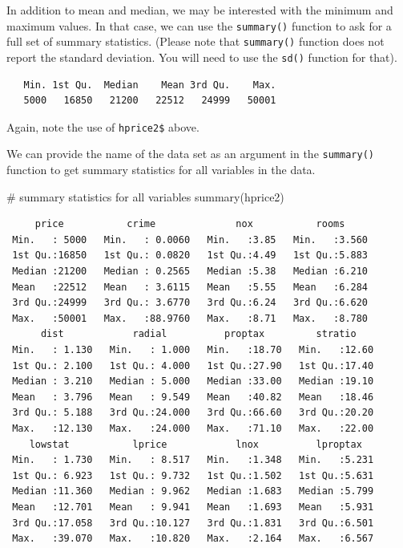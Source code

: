 \documentclass[
  letterpaper,
  DIV=11,
  numbers=noendperiod]{scrreprt}
\newenvironment{Shaded}{\begin{snugshade}}{\end{snugshade}}
\newcommand{\CommentTok}[1]{\textcolor[rgb]{0.37,0.37,0.37}{#1}}
\newcommand{\FunctionTok}[1]{\textcolor[rgb]{0.28,0.35,0.67}{#1}}
\newcommand{\NormalTok}[1]{\textcolor[rgb]{0.00,0.23,0.31}{#1}}
\newcommand{\SpecialCharTok}[1]{\textcolor[rgb]{0.37,0.37,0.37}{#1}}
\begin{document}
In addition to mean and median, we may be interested with the minimum
and maximum values. In that case, we can use the \texttt{summary()}
function to ask for a full set of summary statistics. (Please note that
\texttt{summary()} function does not report the standard deviation. You
will need to use the \texttt{sd()} function for that).

\begin{Shaded}
\end{Shaded}

\begin{verbatim}
   Min. 1st Qu.  Median    Mean 3rd Qu.    Max. 
   5000   16850   21200   22512   24999   50001 
\end{verbatim}

Again, note the use of \texttt{hprice2\$} above.

We can provide the name of the data set as an argument in the
\texttt{summary()} function to get summary statistics for all variables
in the data.

\begin{Shaded}
\begin{Highlighting}[]
\CommentTok{\# summary statistics for all variables}
\FunctionTok{summary}\NormalTok{(hprice2)}
\end{Highlighting}
\end{Shaded}

\begin{verbatim}
     price           crime              nox           rooms      
 Min.   : 5000   Min.   : 0.0060   Min.   :3.85   Min.   :3.560  
 1st Qu.:16850   1st Qu.: 0.0820   1st Qu.:4.49   1st Qu.:5.883  
 Median :21200   Median : 0.2565   Median :5.38   Median :6.210  
 Mean   :22512   Mean   : 3.6115   Mean   :5.55   Mean   :6.284  
 3rd Qu.:24999   3rd Qu.: 3.6770   3rd Qu.:6.24   3rd Qu.:6.620  
 Max.   :50001   Max.   :88.9760   Max.   :8.71   Max.   :8.780  
      dist            radial          proptax         stratio     
 Min.   : 1.130   Min.   : 1.000   Min.   :18.70   Min.   :12.60  
 1st Qu.: 2.100   1st Qu.: 4.000   1st Qu.:27.90   1st Qu.:17.40  
 Median : 3.210   Median : 5.000   Median :33.00   Median :19.10  
 Mean   : 3.796   Mean   : 9.549   Mean   :40.82   Mean   :18.46  
 3rd Qu.: 5.188   3rd Qu.:24.000   3rd Qu.:66.60   3rd Qu.:20.20  
 Max.   :12.130   Max.   :24.000   Max.   :71.10   Max.   :22.00  
    lowstat           lprice            lnox          lproptax    
 Min.   : 1.730   Min.   : 8.517   Min.   :1.348   Min.   :5.231  
 1st Qu.: 6.923   1st Qu.: 9.732   1st Qu.:1.502   1st Qu.:5.631  
 Median :11.360   Median : 9.962   Median :1.683   Median :5.799  
 Mean   :12.701   Mean   : 9.941   Mean   :1.693   Mean   :5.931  
 3rd Qu.:17.058   3rd Qu.:10.127   3rd Qu.:1.831   3rd Qu.:6.501  
 Max.   :39.070   Max.   :10.820   Max.   :2.164   Max.   :6.567  
\end{verbatim}
\end{document}
